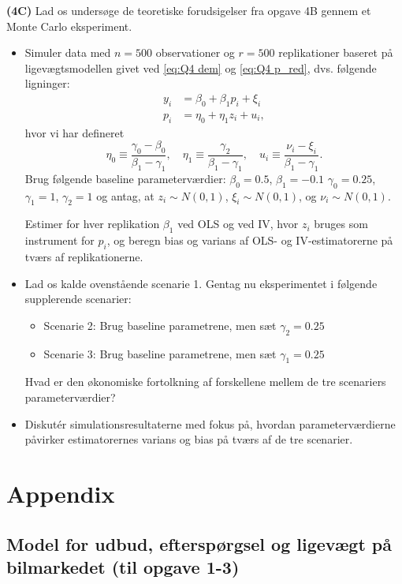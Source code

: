 \documentclass[a4paper,12pt]{article}
\begin{document}
\bigskip \bigskip
\noindent \textbf{(4C)} Lad os undersøge de teoretiske forudsigelser fra opgave 4B gennem et Monte Carlo eksperiment. 
\begin{itemize}
    \item Simuler data med $n= 500$ observationer og $r=500$ replikationer baseret på ligevægtsmodellen givet ved \eqref{eq:Q4 dem} og \eqref{eq:Q4 p_red}, dvs. følgende ligninger:
    \begin{align*}
        y_i &= \beta_0 + \beta_1 p_{i} + \xi_{i} \\
        p_{i} &= \eta_0 + \eta_1 z_{i} + u_{i}, \label{eq:Q4 p_red}
    \end{align*}
    hvor vi har defineret
    $$\eta_0 \equiv \frac{\gamma_0 - \beta_0}{\beta_1-\gamma_1}, \quad \eta_1 \equiv \frac{\gamma_2}{\beta_1-\gamma_1}, \quad  u_i \equiv \frac{\nu_i - \xi_i}{\beta_1-\gamma_1}.
    $$
    Brug følgende baseline parameterværdier:
 \(\beta_0 = 0.5\), $\beta_1=-0.1$ \(\gamma_0 = 0.25\), \(\gamma_1 = 1\), $\gamma_2=1$ og antag, at \(z_{i} \sim N(0,1)\), \(\xi_{i} \sim N(0,1)\), og \(\nu_{i} \sim N(0,1)\). 
    
    Estimer for hver replikation \(\beta_1\) ved OLS og ved IV, hvor \(z_{i}\) bruges som instrument for \(p_{i}\), og beregn bias og varians af OLS- og IV-estimatorerne på tværs af replikationerne. 
    \item Lad os kalde ovenstående scenarie 1. Gentag nu eksperimentet i følgende supplerende scenarier:
    \begin{itemize}
      \item Scenarie 2: Brug baseline parametrene, men sæt $\gamma_2 = 0.25$
      \item Scenarie 3: Brug baseline parametrene, men sæt $\gamma_1 = 0.25$ 
      \end{itemize}
      Hvad er den økonomiske fortolkning af forskellene mellem de tre scenariers parameterværdier?
    \item  Diskutér simulationsresultaterne med fokus på, hvordan parameterværdierne påvirker estimatorernes varians og bias på tværs af de tre scenarier.
\end{itemize}





\break

\appendix
\section*{Appendix}
\subsection*{Model for udbud, efterspørgsel og ligevægt på bilmarkedet (til opgave 1-3)}
\setcounter{equation}{0}\renewcommand{}
\end{document}
